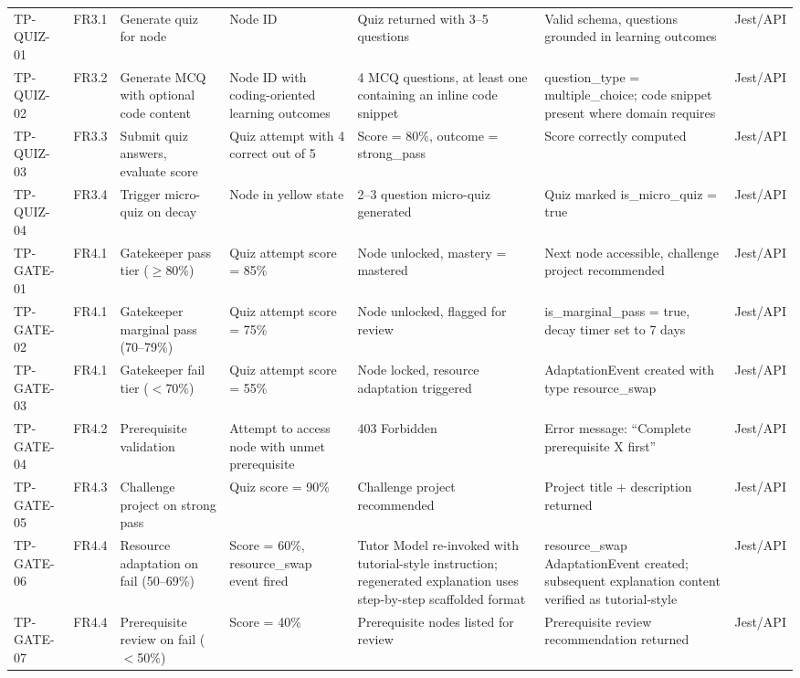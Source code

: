 \begin{longtable}{p{1.8cm}p{1.5cm}p{2.2cm}p{2.2cm}p{2.5cm}p{1.8cm}p{1.2cm}}
TP-QUIZ-01 & FR3.1 & Generate quiz for node & Node ID & Quiz returned with 3--5 questions & Valid schema, questions grounded in learning outcomes & Jest/API \\
TP-QUIZ-02 & FR3.2 & Generate MCQ with optional code content & Node ID with coding-oriented learning outcomes & 4 MCQ questions, at least one containing an inline code snippet & question\_type = multiple\_choice; code snippet present where domain requires & Jest/API \\
TP-QUIZ-03 & FR3.3 & Submit quiz answers, evaluate score & Quiz attempt with 4 correct out of 5 & Score = 80\%, outcome = strong\_pass & Score correctly computed & Jest/API \\
TP-QUIZ-04 & FR3.4 & Trigger micro-quiz on decay & Node in yellow state & 2--3 question micro-quiz generated & Quiz marked is\_micro\_quiz = true & Jest/API \\
TP-GATE-01 & FR4.1 & Gatekeeper pass tier ($\ge$80\%) & Quiz attempt score = 85\% & Node unlocked, mastery = mastered & Next node accessible, challenge project recommended & Jest/API \\
TP-GATE-02 & FR4.1 & Gatekeeper marginal pass (70--79\%) & Quiz attempt score = 75\% & Node unlocked, flagged for review & is\_marginal\_pass = true, decay timer set to 7 days & Jest/API \\
TP-GATE-03 & FR4.1 & Gatekeeper fail tier ($<$70\%) & Quiz attempt score = 55\% & Node locked, resource adaptation triggered & AdaptationEvent created with type resource\_swap & Jest/API \\
TP-GATE-04 & FR4.2 & Prerequisite validation & Attempt to access node with unmet prerequisite & 403 Forbidden & Error message: ``Complete prerequisite X first'' & Jest/API \\
TP-GATE-05 & FR4.3 & Challenge project on strong pass & Quiz score = 90\% & Challenge project recommended & Project title + description returned & Jest/API \\
TP-GATE-06 & FR4.4 & Resource adaptation on fail (50--69\%) & Score = 60\%, resource\_swap event fired & Tutor Model re-invoked with tutorial-style instruction; regenerated explanation uses step-by-step scaffolded format & resource\_swap AdaptationEvent created; subsequent explanation content verified as tutorial-style & Jest/API \\
TP-GATE-07 & FR4.4 & Prerequisite review on fail ($<$50\%) & Score = 40\% & Prerequisite nodes listed for review & Prerequisite review recommendation returned & Jest/API \\

\end{longtable}
